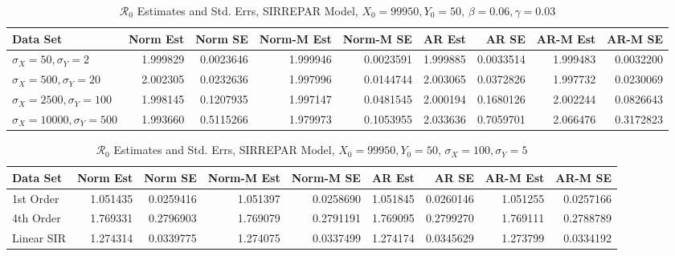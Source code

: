 \documentclass[12pt]{article}
\newcommand{\rr}{\ensuremath{\mathcal{R}_0}}
\begin{document}
\begin{table}[H]
	
	\caption{\label{tab:}$\rr$ Estimates and Std. Errs, SIRREPAR Model,
		$X_0 = 99950, Y_0 = 50$, $\beta = 0.06, \gamma = 0.03$}
	\centering
	\begin{footnotesize}
		\begin{tabular}[t]{l|r|r|r|r|r|r|r|r}
			\hline
			Data Set & Norm Est & Norm SE & Norm-M Est & Norm-M SE & AR Est & AR SE & AR-M Est & AR-M SE\\
			\hline
			$\sigma_X = 50, \sigma_Y = 2$ & 1.999829 & 0.0023646 & 1.999946 & 0.0023591 & 1.999885 & 0.0033514 & 1.999483 & 0.0032200\\
			\hline
			$\sigma_X = 500, \sigma_Y = 20$ & 2.002305 & 0.0232636 & 1.997996 & 0.0144744 & 2.003065 & 0.0372826 & 1.997732 & 0.0230069\\
			\hline
			$\sigma_X = 2500, \sigma_Y = 100$ & 1.998145 & 0.1207935 & 1.997147 & 0.0481545 & 2.000194 & 0.1680126 & 2.002244 & 0.0826643\\
			\hline
			$\sigma_X = 10000, \sigma_Y = 500$ & 1.993660 & 0.5115266 & 1.979973 & 0.1053955 & 2.033636 & 0.7059701 & 2.066476 & 0.3172823\\
			\hline
		\end{tabular}
	\end{footnotesize}
\end{table}

\begin{table}[H]
	
	\caption{\label{tab:}$\rr$ Estimates and Std. Errs, SIRREPAR Model,
		$X_0 = 99950, Y_0 = 50$, $\sigma_X = 100, \sigma_Y = 5$}
	\centering
	\begin{footnotesize}
		\begin{tabular}[t]{l|r|r|r|r|r|r|r|r}
			\hline
			Data Set & Norm Est & Norm SE & Norm-M Est & Norm-M SE & AR Est & AR SE & AR-M Est & AR-M SE\\
			\hline
			1st Order & 1.051435 & 0.0259416 & 1.051397 & 0.0258690 & 1.051845 & 0.0260146 & 1.051255 & 0.0257166\\
			\hline
			4th Order & 1.769331 & 0.2796903 & 1.769079 & 0.2791191 & 1.769095 & 0.2799270 & 1.769111 & 0.2788789\\
			\hline
			Linear SIR & 1.274314 & 0.0339775 & 1.274075 & 0.0337499 & 1.274174 & 0.0345629 & 1.273799 & 0.0334192\\
			\hline
		\end{tabular}
	\end{footnotesize}
\end{table}
\end{document}
